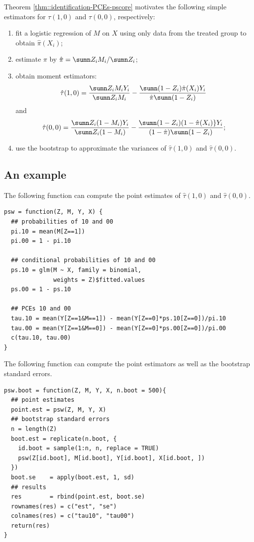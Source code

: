  
Theorem \ref{thm::identification-PCEs-pscore} motivates the following simple estimators for  $\tau(1,0)$ and $\tau(0,0) $, respectively:
\begin{enumerate}
\item
fit a logistic regression of $M$ on $X$ using only data from the treated group to obtain $\hat \pi(X_i)$;
\item
estimate $\pi$ by $\hat \pi =  \sumn Z_i M_i / \sumn Z_i$; 
\item
obtain moment estimators:
$$
\hat \tau(1,0) =  \frac{  \sumn Z_iM_iY_i  }{ \sumn Z_iM_i }   -   \frac{   \sumn (1-Z_i) \hat \pi(X_i) Y_i  }{ \hat \pi   \sumn (1-Z_i) }   
$$
and
$$
\hat \tau(0,0) =  \frac{  \sumn Z_i(1-M_i)Y_i  }{ \sumn Z_i (1-M_i) }  - \frac{  \sumn (1-Z_i)(1-\hat \pi(X_i)\} Y_i  }{  (1- \hat \pi )\sumn (1-Z_i)  }
;
$$
\item
use the bootstrap to approximate the variances of $\hat \tau(1,0) $ and $\hat \tau(0,0) $. 
\end{enumerate}
 
 
 
 
 \subsection{An example}

The following function can compute the point estimates of $\hat \tau(1,0) $ and $\hat \tau(0,0) $. 

  \begin{lstlisting}
psw = function(Z, M, Y, X) {
  ## probabilities of 10 and 00
  pi.10 = mean(M[Z==1])
  pi.00 = 1 - pi.10
  
  ## conditional probabilities of 10 and 00
  ps.10 = glm(M ~ X, family = binomial, 
              weights = Z)$fitted.values
  ps.00 = 1 - ps.10
  
  ## PCEs 10 and 00 
  tau.10 = mean(Y[Z==1&M==1]) - mean(Y[Z==0]*ps.10[Z==0])/pi.10
  tau.00 = mean(Y[Z==1&M==0]) - mean(Y[Z==0]*ps.00[Z==0])/pi.00
  c(tau.10, tau.00)
}
   \end{lstlisting}

The following function can compute the point estimators as well as the bootstrap standard errors.
  \begin{lstlisting}
psw.boot = function(Z, M, Y, X, n.boot = 500){
  ## point estimates
  point.est = psw(Z, M, Y, X)
  ## bootstrap standard errors
  n = length(Z)  
  boot.est = replicate(n.boot, {
    id.boot = sample(1:n, n, replace = TRUE)
    psw(Z[id.boot], M[id.boot], Y[id.boot], X[id.boot, ])
  })
  boot.se    = apply(boot.est, 1, sd)
  ## results
  res        = rbind(point.est, boot.se)
  rownames(res) = c("est", "se")
  colnames(res) = c("tau10", "tau00")
  return(res)
}
    \end{lstlisting}
    
